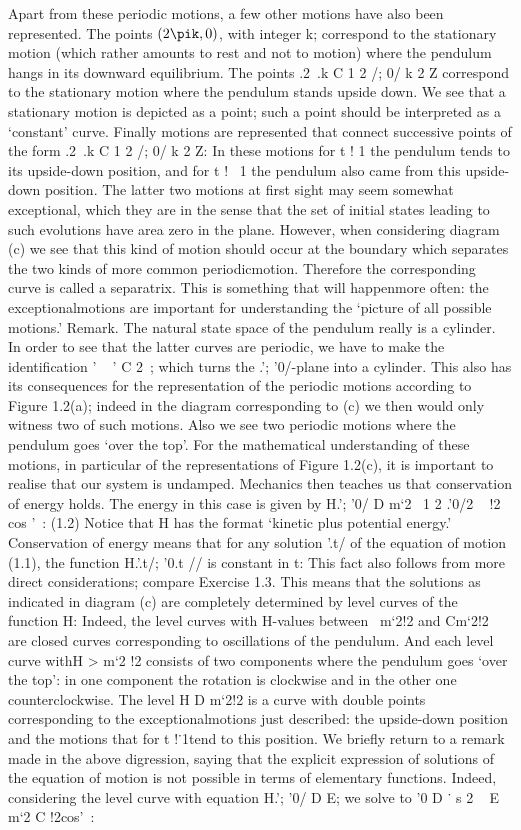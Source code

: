 \documentclass[12pt]{article}
\begin{document}
\begin{enumerate}
Apart from these periodic motions, a few other motions have also been represented.
The points $(2\pik,0)$, with integer k; correspond to the stationary motion
(which rather amounts to rest and not to motion) where the pendulum hangs in
its downward equilibrium. The points .2 .k C 1
2 /; 0/ k 2 Z correspond to the
stationary motion where the pendulum stands upside down. We see that a stationary
motion is depicted as a point; such a point should be interpreted as a ‘constant’
curve. Finally motions are represented that connect successive points of the form
.2 .k C 1
2 /; 0/ k 2 Z: In these motions for t ! 1 the pendulum tends to
its upside-down position, and for t !  1 the pendulum also came from this
upside-down position. The latter two motions at first sight may seem somewhat
exceptional, which they are in the sense that the set of initial states leading to such
evolutions have area zero in the plane. However, when considering diagram (c) we
see that this kind of motion should occur at the boundary which separates the two
kinds of more common periodicmotion. Therefore the corresponding curve is called
a separatrix. This is something that will happenmore often: the exceptionalmotions
are important for understanding the ‘picture of all possible motions.’
Remark. The natural state space of the pendulum really is a cylinder. In order to see
that the latter curves are periodic, we have to make the identification '   ' C 2 ;
which turns the .'; '0/-plane into a cylinder. This also has its consequences for
the representation of the periodic motions according to Figure 1.2(a); indeed in the
diagram corresponding to (c) we then would only witness two of such motions. Also
we see two periodic motions where the pendulum goes ‘over the top’.
For the mathematical understanding of these motions, in particular of the representations
of Figure 1.2(c), it is important to realise that our system is undamped.
Mechanics then teaches us that conservation of energy holds. The energy in this case
is given by
H.'; '0/ D m`2  1
2
.'0/2   !2 cos ' : (1.2)
Notice that H has the format ‘kinetic plus potential energy.’ Conservation of energy
means that for any solution '.t/ of the equation of motion (1.1), the function
H.'.t/; '0.t // is constant in t: This fact also follows from more direct considerations;
compare Exercise 1.3. This means that the solutions as indicated in diagram
(c) are completely determined by level curves of the function H: Indeed, the level
curves with H-values between  m`2!2 and Cm`2!2 are closed curves corresponding
to oscillations of the pendulum. And each level curve withH > m`2 !2
consists of two components where the pendulum goes ‘over the top’: in one component
the rotation is clockwise and in the other one counterclockwise. The level
H D m`2!2 is a curve with double points corresponding to the exceptionalmotions
just described: the upside-down position and the motions that for t !˙1tend to
this position.
We briefly return to a remark made in the above digression, saying that the
explicit expression of solutions of the equation of motion is not possible in terms of
elementary functions. Indeed, considering the level curve with equation H.'; '0/ D E; we solve to
'0 D ˙
s
2   E
m`2 C !2cos' :
\end{enumerate}
\end{document}
